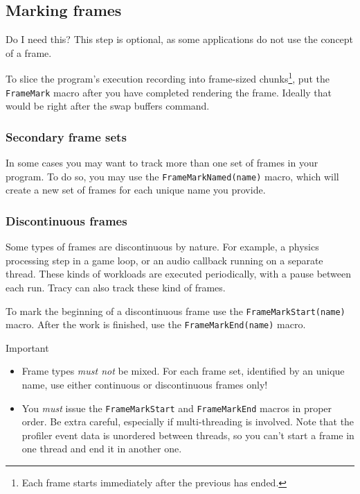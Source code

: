 \documentclass[hidelinks,titlepage,a4paper]{article}
\begin{document}
\subsection{Marking frames}
\label{markingframes}

\begin{bclogo}[
noborder=true,
couleur=black!5,
logo=\bclampe
]{Do I need this?}
This step is optional, as some applications do not use the concept of a frame.
\end{bclogo}

To slice the program's execution recording into frame-sized chunks\footnote{Each frame starts immediately after the previous has ended.}, put the \texttt{FrameMark} macro after you have completed rendering the frame. Ideally that would be right after the swap buffers command.

\subsubsection{Secondary frame sets}
\label{secondaryframeset}

In some cases you may want to track more than one set of frames in your program. To do so, you may use the \texttt{FrameMarkNamed(name)} macro, which will create a new set of frames for each unique name you provide.

\subsubsection{Discontinuous frames}

Some types of frames are discontinuous by nature. For example, a physics processing step in a game loop, or an audio callback running on a separate thread. These kinds of workloads are executed periodically, with a pause between each run. Tracy can also track these kind of frames.

To mark the beginning of a discontinuous frame use the \texttt{FrameMarkStart(name)} macro. After the work is finished, use the \texttt{FrameMarkEnd(name)} macro.

\begin{bclogo}[
noborder=true,
couleur=black!5,
logo=\bcbombe
]{Important}
\begin{itemize}
\item Frame types \emph{must not} be mixed. For each frame set, identified by an unique name, use either continuous or discontinuous frames only!
\item You \emph{must} issue the \texttt{FrameMarkStart} and \texttt{FrameMarkEnd} macros in proper order. Be extra careful, especially if multi-threading is involved. Note that the profiler event data is unordered between threads, so you can't start a frame in one thread and end it in another one.
\end{itemize}
\end{bclogo}
\end{document}
